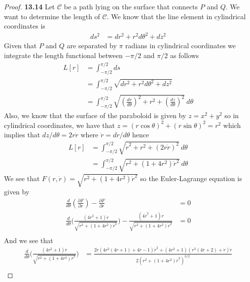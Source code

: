 \documentclass[11pt]{article}
\theoremstyle{definition}
\begin{document}
\begin{proof}{\textbf{13.14}}
    Let  $\mathcal{C}$ be a path lying on the surface that connects $P$ and $Q$.
    We want to determine the length of $\mathcal{C}$. We know that the line
    element in cylindrical coordinates is 
    \begin{align*}
        ds^2 &= dr^2 + r^2d\theta^2 + dz^2
    \end{align*}
    Given that $P$ and $Q$ are separated by $\pi$ radians in cylindrical
    coordinates we integrate the length functional between
    $-\pi/2$ and $\pi/2$ as follows
    \begin{align*}
       L[r] &= \int_{-\pi/2}^{\pi/2} ds\\
        &= \int_{-\pi/2}^{\pi/2} \sqrt{dr^2 + r^2d\theta^2 + dz^2}\\
        &= \int_{-\pi/2}^{\pi/2}
        \sqrt{\left(\frac{dr}{d\theta}\right)^2 + r^2 + \left(\frac{dz}{d\theta}\right)^2}~d\theta
    \end{align*}
    Also, we know that the surface of the paraboloid is given by $z = x^2 + y^2$
    so in cylindrical coordinates, we have that
    $z = (r\cos\theta)^2 + (r\sin\theta)^2 = r^2$
    which implies that $dz/d\theta = 2r\dot{r}$ where $\dot r = dr/d\theta$ hence
    \begin{align*}
        L[r] &= \int_{-\pi/2}^{\pi/2}
        \sqrt{\dot{r}^2
        + r^2
        + \left(2r\dot{r}\right)^2}~d\theta\\
        &= \int_{-\pi/2}^{\pi/2}
        \sqrt{r^2 + (1 + 4r^2)\dot{r}^2}~d\theta
    \end{align*}
    We see that $F(r, \dot{r}) = \sqrt{r^2 + (1 + 4r^2)\dot{r}^2}$ so
    the Euler-Lagrange equation is given by
    \begin{align*}
        \frac{d}{d\theta}\left(\frac{\partial F}{\partial \dot r}\right)
        - \frac{\partial F}{\partial r} &= 0\\
        \frac{d}{d\theta}\bigg(\frac{(4r^2+1)\dot{r}}{\sqrt{r^2 + (1 + 4r^2)\dot{r}^2}}\bigg)
        - \frac{(4\dot r^2+1)r}{\sqrt{r^2 + (1 + 4r^2)\dot{r}^2}} &= 0\\
    \end{align*}
    And we see that 
    \begin{align*}
        \frac{d}{d\theta}\bigg(\frac{(4r^2+1)\dot{r}}{\sqrt{r^2 + (1 + 4r^2)\dot{r}^2}}\bigg)
        &= \frac{2r(4r^2(4\dot r + 1) + 4\dot r - 1)\dot r^2 + (4r^2 + 1)(r^2(4\dot r + 2) + \dot r)\ddot r}
        {2(r^2 + (1 + 4r^2)\dot r^2)^{3/2}}\\

\end{align*}
\end{proof}
\end{document}
